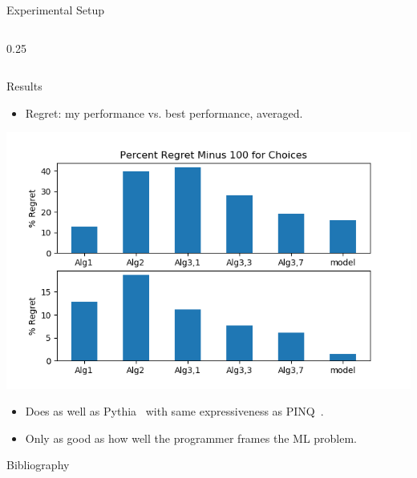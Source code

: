 \documentclass[final]{beamer}
\newlength{\sepwid}
\newlength{\onecolwid}
\begin{document}
\begin{frame}[t,fragile]
\begin{columns}
\begin{column}{\onecolwid}
\begin{block}{Experimental Setup}
\begin{columns}[c]
\begin{column}{0.25\onecolwid}
\end{column}
\end{columns}
\end{block}
\begin{block}{Results}
\begin{itemize}
\item Regret: my performance vs. best performance, averaged.
\end{itemize}
\begin{center}
\includegraphics[scale=1.5]{Results}
\end{center}
\begin{itemize}
\item Does as well as Pythia~\cite{Kotsogiannis:2017} with same expressiveness as PINQ~\cite{McSherry:2010}.
\item Only as good as how well the programmer frames the ML problem.
\end{itemize}
\end{block}
\begin{block}{Bibliography}
\small{
\vspace{0.75in}}
\end{block}
\end{column}
\end{columns}
\end{frame}
\end{document}
